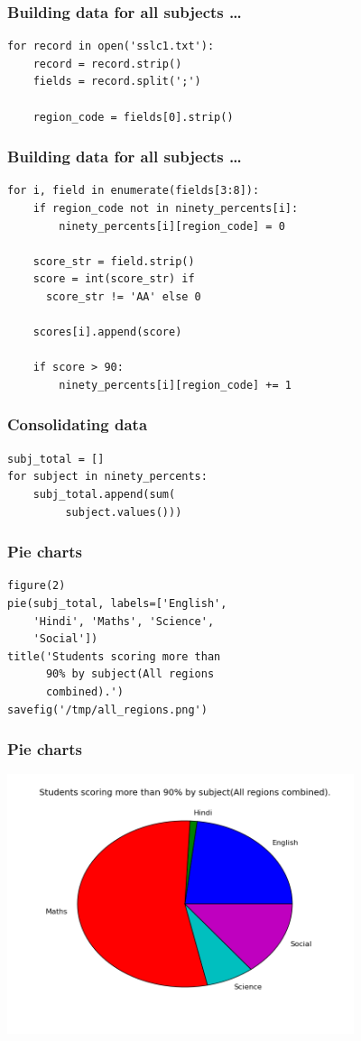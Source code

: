 \documentclass[14pt,compress]{beamer}
\begin{document}
\begin{frame}[fragile]
  \frametitle{Building data for all subjects \ldots}
  \begin{lstlisting}
for record in open('sslc1.txt'):
    record = record.strip()
    fields = record.split(';')

    region_code = fields[0].strip()
  \end{lstlisting}
\end{frame}

\begin{frame}[fragile]
  \frametitle{Building data for all subjects \ldots}
  \small
  \begin{lstlisting}
for i, field in enumerate(fields[3:8]):
    if region_code not in ninety_percents[i]:
        ninety_percents[i][region_code] = 0

    score_str = field.strip()
    score = int(score_str) if
      score_str != 'AA' else 0

    scores[i].append(score)

    if score > 90:
        ninety_percents[i][region_code] += 1
  \end{lstlisting}
\end{frame}

\begin{frame}[fragile]
  \frametitle{Consolidating data}
  \begin{lstlisting}
subj_total = []
for subject in ninety_percents:
    subj_total.append(sum(
         subject.values()))
  \end{lstlisting}
\end{frame}

\begin{frame}[fragile]
  \frametitle{Pie charts}
  \begin{lstlisting}
figure(2)
pie(subj_total, labels=['English',
    'Hindi', 'Maths', 'Science',
    'Social'])
title('Students scoring more than
      90% by subject(All regions
      combined).')
savefig('/tmp/all_regions.png')
  \end{lstlisting}
\end{frame}

\begin{frame}[fragile]
  \frametitle{Pie charts}
  \includegraphics[height=3in, interpolate=true]{data/all_regions}
\end{frame}
\end{document}
